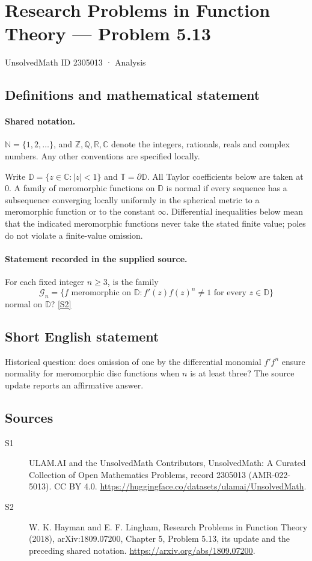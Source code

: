 \documentclass[11pt]{article}
\newcommand{\sref}[2]{\hyperlink{source:#1:#2}{[S#2]}}
\begin{document}
\setcounter{section}{2305012}
\section{Research Problems in Function Theory — Problem 5.13}\label{2305013}
{\small\sffamily UnsolvedMath ID 2305013 · Analysis}
\subsection{Definitions and mathematical statement}

\paragraph{Shared notation.}$\mathbb N=\{1,2,\ldots\}$, and $\mathbb Z,\mathbb Q,\mathbb R,\mathbb C$ denote the integers, rationals, reals and complex numbers. Any other conventions are specified locally.


Write $\mathbb D=\{z\in\mathbb C:|z|<1\}$ and $\mathbb T=\partial\mathbb D$. All Taylor coefficients below are taken at $0$. A family of meromorphic functions on $\mathbb D$ is normal if every sequence has a subsequence converging locally uniformly in the spherical metric to a meromorphic function or to the constant $\infty$. Differential inequalities below mean that the indicated meromorphic functions never take the stated finite value; poles do not violate a finite-value omission.
\paragraph{Statement recorded in the supplied source.}
For each fixed integer $n\ge3$, is the family
\[\mathcal G_n=\{f\text{ meromorphic on }\mathbb D:f'(z)f(z)^n\ne1\text{ for every }z\in\mathbb D\}\]
normal on $\mathbb D$? \sref{2305013}{2}
\subsection{Short English statement}
Historical question: does omission of one by the differential monomial $f'f^n$ ensure normality for meromorphic disc functions when $n$ is at least three? The source update reports an affirmative answer.
\subsection{Sources}
\begin{description}
\item[\hypertarget{source:2305013:1}{S1}] ULAM.AI and the UnsolvedMath Contributors, UnsolvedMath: A Curated Collection of Open Mathematics Problems, record 2305013 (AMR-022-5013). CC BY 4.0. \url{https://huggingface.co/datasets/ulamai/UnsolvedMath}.
\item[\hypertarget{source:2305013:2}{S2}] W. K. Hayman and E. F. Lingham, Research Problems in Function Theory (2018), arXiv:1809.07200, Chapter 5, Problem 5.13, its update and the preceding shared notation. \url{https://arxiv.org/abs/1809.07200}.
\end{description}
\label{end:2305013}
\end{document}
